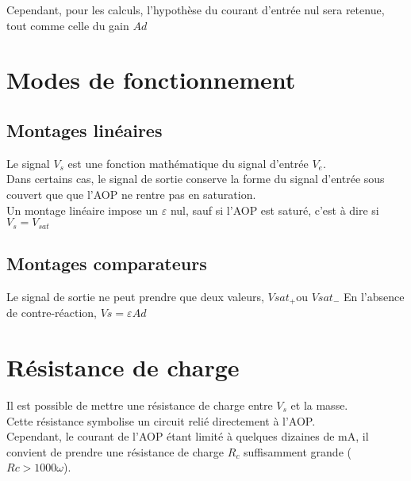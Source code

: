 

Cependant, pour les calculs, {\color{red}l’hypothèse du courant d’entrée} nul sera retenue, tout comme celle du gain $Ad$


\section{ Modes de fonctionnement}


\subsection{Montages linéaires }
Le signal $V_s$ est une fonction mathématique du signal d’entrée $V_e$. \\

Dans certains cas, le signal de sortie conserve la forme du signal d’entrée sous couvert que que l’AOP ne rentre pas en saturation. \\


Un {\color{red}montage linéaire impose un $\varepsilon$ nul, sauf si l’AOP est saturé}, c’est à dire si $V_s=V_{sat}$




\subsection{Montages comparateurs}

Le signal de sortie ne peut prendre que deux valeurs, $Vsat_+$ou $Vsat_-$
En l’absence de contre-réaction, $Vs=\varepsilon Ad$ \\



\section{Résistance de charge}

Il est possible de mettre une résistance de charge entre $V_s$ et la masse. \\

Cette résistance symbolise un circuit relié directement à l'AOP. \\

Cependant, le courant de l’AOP étant limité à quelques dizaines de mA, il convient de prendre une résistance de charge $R_c$ suffisamment grande ($Rc>1000 \omega$). \\

